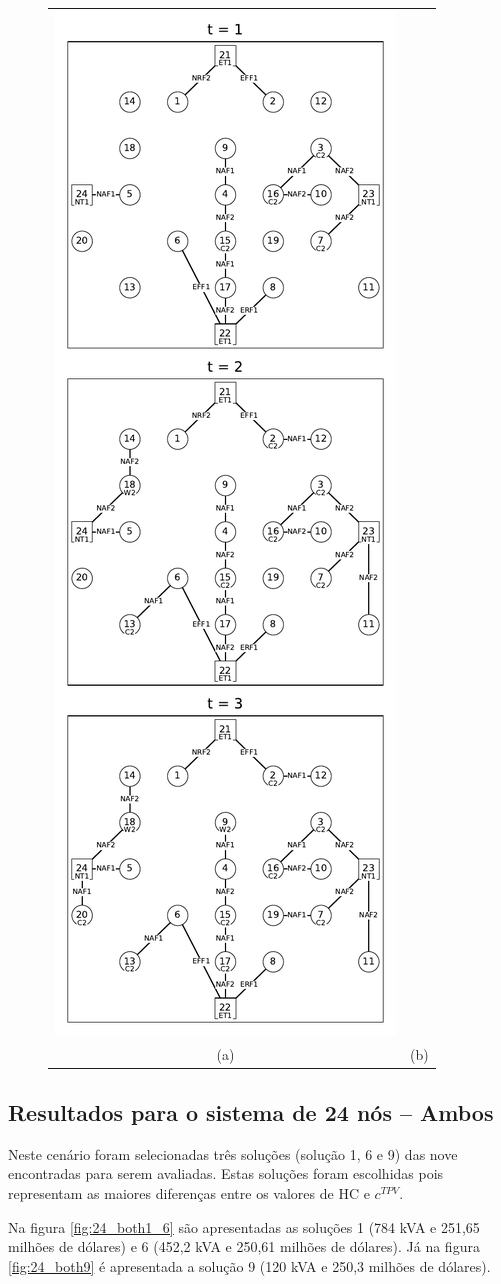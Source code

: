 \begin{figure}[H]
\begin{tabular}{cc}
    \includegraphics[width=0.49\columnwidth]{cap4/resultados/24_ev9.pdf} \\
    (a) & (b) 
\end{tabular}
\label{fig:24_ev5_9}
\end{figure}

\newpage
\subsection{Resultados para o sistema de 24 nós -- Ambos}

Neste cenário foram selecionadas três soluções (solução 1, 6 e 9) das nove encontradas para serem avaliadas. Estas soluções foram escolhidas pois representam as maiores diferenças entre os valores de \ac{HC} e $c^{TPV}$.


Na figura \ref{fig:24_both1_6} são apresentadas as soluções 1 (784 kVA e 251,65 milhões de dólares) e 6 (452,2 kVA e 250,61 milhões de dólares). Já na figura \ref{fig:24_both9} é apresentada a solução 9 (120 kVA e 250,3 milhões de dólares).

